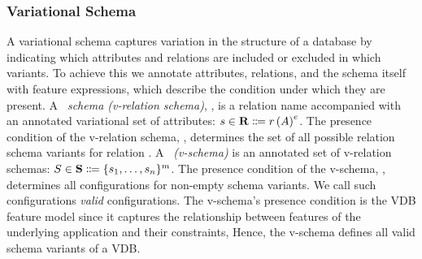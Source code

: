 \subsubsection{Variational Schema}
\label{sec:vsch}




A variational schema captures variation in the structure of a database by indicating which attributes and relations are included or excluded in which variants.
%
To achieve this we annotate attributes, relations, and the schema itself with feature expressions,
which describe the condition under which they are present.
%
A \emph{\vrelTxt\ schema (v-relation schema)}, \vRelSch, is a relation name
accompanied with an annotated variational set of attributes:
$\synDef {\vRelSch} \vRelSchSet \eqq \vRelDef$.
The presence condition of the v-relation schema, \dimMeta, determines the
set of all possible relation schema variants for relation \vRel.
%
A \emph{\vschTxt\ (v-schema)} is an annotated set of v-relation 
schemas:
$\synDef \vSch \vSchSet \eqq \vSchDef$.
The presence condition of the v-schema, \fModel, determines all  
configurations for non-empty schema variants. We call such configurations
\emph{valid} configurations. The v-schema's presence condition 
is the VDB feature model since it captures the relationship
between features of the underlying application and their constraints,
Hence, the v-schema defines all valid schema variants of a VDB. 


